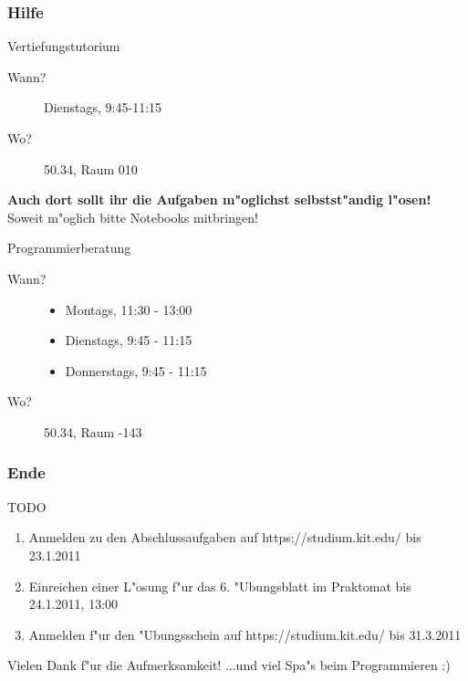 \documentclass{beamer}
\begin{document}
\begin{frame}
\frametitle{Hilfe}
\begin{block}{Vertiefungstutorium}
\begin{description}
\item[Wann?] Dienstags, 9:45-11:15
\item[Wo?] 50.34, Raum 010
\end{description}
\textbf{Auch dort sollt ihr die Aufgaben m"oglichst selbstst"andig l"osen!}
\alert{Soweit m"oglich bitte Notebooks mitbringen!}
\end{block}

\begin{block}{Programmierberatung}
\begin{description}
\item[Wann?]
\begin{itemize}
\item Montags, 11:30 - 13:00
\item Dienstags, 9:45 - 11:15
\item Donnerstags, 9:45 - 11:15
\end{itemize}
\item[Wo?] 50.34, Raum -143
\end{description}
\end{block}
\end{frame}


\begin{frame}
\frametitle{Ende}
\begin{block}{TODO}
\begin{enumerate}
\item Anmelden zu den Abschlussaufgaben auf https://studium.kit.edu/ bis \alert{23.1.2011}
\item Einreichen einer L"osung f"ur das 6. "Ubungsblatt im Praktomat bis \alert{24.1.2011, 13:00}
\item Anmelden f"ur den "Ubungsschein auf https://studium.kit.edu/ bis \alert{31.3.2011}
\end{enumerate}
\end{block}

\begin{block}{Vielen Dank f"ur die Aufmerksamkeit!}
...und viel Spa"s beim Programmieren :)
\end{block}
\end{frame}
\end{document}

